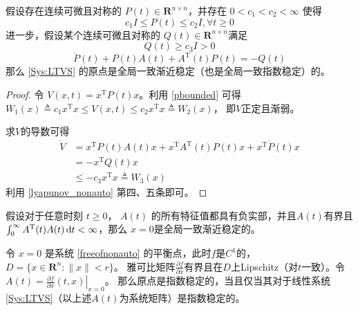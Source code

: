 \begin{corollary}
  假设存在连续可微且对称的 $P (t) \in \mathbf{R}^{n \times n}$，并存在 $0 < c_1 < c_2 < \infty$
  使得
  \begin{equation}\label{pbounded}
    c_1 I \leq P (t) \leq c_2 I, \forall t \geq 0
  \end{equation}
  进一步，假设某个连续可微且对称的 $Q (t) \in \mathbf{R}^{n \times n}$满足
  \[ Q (t) \geq c_3 I > 0 \]
  \[ \dot{P} (t) + P (t) A (t) + A^\mathrm{T} (t) P (t) = - Q (t) \]
  那么 \eqref{Sys:LTVS} 的原点是全局一致渐近稳定（也是全局一致指数稳定）的。
\end{corollary}
\begin{proof}
    令 $V (x, t) = x^\mathrm{T} P (t) x$。利用 \eqref{pbounded} 可得
  $W_1 (x) \triangleq c_1 x^\mathrm{T} x \leq V (x, t) \leq c_2 x^\mathrm{T} x \triangleq W_2 (x)$，
  即$V$正定且渐弱。
  
  求$V$的导数可得
  \begin{align*}
    \dot{V} & =  x^\mathrm{T} P (t) A (t) x + x^\mathrm{T} A^\mathrm{T} (t) P (t) x + x^\mathrm{T} \dot{P} (t) x\\
    & =  - x^\mathrm{T} Q (t) x\\
    & \leq  - c_3 x^\mathrm{T} x \triangleq W_3 (x)
  \end{align*}
  利用 \ref{lyapunov_nonauto} 第四、五条即可。
\end{proof}

\begin{corollary}
  假设对于任意时刻 $t \geq 0$， $A (t)$ 的所有特征值都具有负实部，并且$A (t)$有界且 $\int^{\infty}_0
  A^\mathrm{T} (t) A (t) \mathop{}\!\mathrm{d}  t < \infty$，那么 $x = 0$是全局一致渐近稳定的。
\end{corollary}
\begin{theorem}[利用线性化判别非自治系统的稳定性]
    令 $x = 0$ 是系统 \eqref{freeofnonauto} 的平衡点，此时$f$是$C^1$的，$D=\{x\in \mathbf{R}^n:\|x\|<r\}$。
    雅可比矩阵$\frac{\partial f}{\partial x}$有界且在$D$上Lipschitz（对$t$一致）。令$A(t)=\left.\frac{\partial f}{\partial x}(t,x)\right|_{x=0}$。
    那么原点是指数稳定的，当且仅当其对于线性系统 \eqref{Sys:LTVS}（以上述$A(t)$为系统矩阵）是指数稳定的。
\end{theorem}